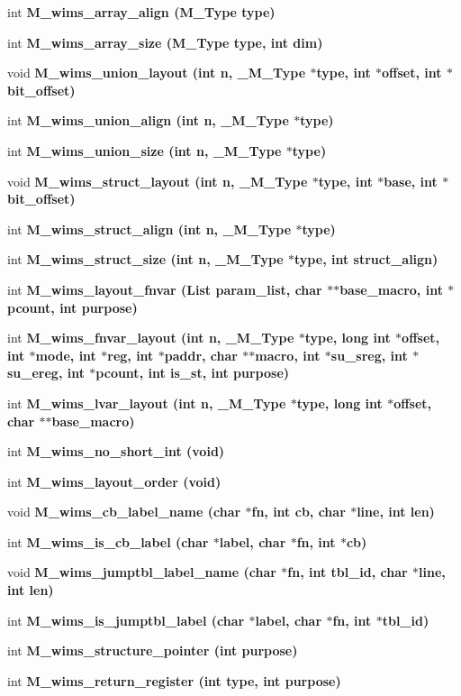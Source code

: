 \begin{CompactItemize}
int \bf{M\_\-wims\_\-array\_\-align} (\bf{M\_\-Type} type)
\item 
int \bf{M\_\-wims\_\-array\_\-size} (\bf{M\_\-Type} type, int dim)
\item 
void \bf{M\_\-wims\_\-union\_\-layout} (int n, \bf{\_\-M\_\-Type} $\ast$type, int $\ast$offset, int $\ast$bit\_\-offset)
\item 
int \bf{M\_\-wims\_\-union\_\-align} (int n, \bf{\_\-M\_\-Type} $\ast$type)
\item 
int \bf{M\_\-wims\_\-union\_\-size} (int n, \bf{\_\-M\_\-Type} $\ast$type)
\item 
void \bf{M\_\-wims\_\-struct\_\-layout} (int n, \bf{\_\-M\_\-Type} $\ast$type, int $\ast$base, int $\ast$bit\_\-offset)
\item 
int \bf{M\_\-wims\_\-struct\_\-align} (int n, \bf{\_\-M\_\-Type} $\ast$type)
\item 
int \bf{M\_\-wims\_\-struct\_\-size} (int n, \bf{\_\-M\_\-Type} $\ast$type, int struct\_\-align)
\item 
int \bf{M\_\-wims\_\-layout\_\-fnvar} (\bf{List} param\_\-list, char $\ast$$\ast$base\_\-macro, int $\ast$pcount, int purpose)
\item 
int \bf{M\_\-wims\_\-fnvar\_\-layout} (int n, \bf{\_\-M\_\-Type} $\ast$type, long int $\ast$offset, int $\ast$\bf{mode}, int $\ast$reg, int $\ast$paddr, char $\ast$$\ast$macro, int $\ast$su\_\-sreg, int $\ast$su\_\-ereg, int $\ast$pcount, int is\_\-st, int purpose)
\item 
int \bf{M\_\-wims\_\-lvar\_\-layout} (int n, \bf{\_\-M\_\-Type} $\ast$type, long int $\ast$offset, char $\ast$$\ast$base\_\-macro)
\item 
int \bf{M\_\-wims\_\-no\_\-short\_\-int} (void)
\item 
int \bf{M\_\-wims\_\-layout\_\-order} (void)
\item 
void \bf{M\_\-wims\_\-cb\_\-label\_\-name} (char $\ast$fn, int cb, char $\ast$line, int len)
\item 
int \bf{M\_\-wims\_\-is\_\-cb\_\-label} (char $\ast$label, char $\ast$fn, int $\ast$cb)
\item 
void \bf{M\_\-wims\_\-jumptbl\_\-label\_\-name} (char $\ast$fn, int tbl\_\-id, char $\ast$line, int len)
\item 
int \bf{M\_\-wims\_\-is\_\-jumptbl\_\-label} (char $\ast$label, char $\ast$fn, int $\ast$tbl\_\-id)
\item 
int \bf{M\_\-wims\_\-structure\_\-pointer} (int purpose)
\item 
int \bf{M\_\-wims\_\-return\_\-register} (int type, int purpose)
$$
\end{CompactItemize}
